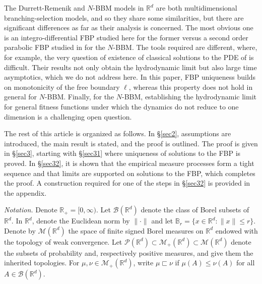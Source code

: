 \documentclass[11pt]{amsart}
\theoremstyle{plain}
\newcommand{\R}{{\mathbb R}}
\newcommand{\calB}{{\mathcal B}}
\newcommand{\calM}{{\mathcal M}}
\newcommand{\calP}{{\mathcal P}}
\newcommand{\iy}{\infty}
\begin{document}
The Durrett-Remenik and $N$-BBM models in $\R^d$ are both multidimensional branching-selection models, and so they share some similarities, but there are significant differences as far as their analysis is concerned. The most obvious one is an integro-differential FBP studied here for the former versus a second order parabolic FBP studied in \cite{ber21, ber22bee} for the $N$-BBM.
The tools required are different, where, for example, the very question of existence of classical solutions to the PDE of \cite{ber21, ber22bee} is difficult. Their results not only obtain the hydrodynamic limit but also large time asymptotics, which we do not address here.
In this paper, FBP uniqueness builds on monotonicity of the free boundary $\ell$, whereas this property does not hold in general for $N$-BBM. Finally, for the $N$-BBM, establishing the hydrodynamic limit for general fitness functions under which the dynamics do not reduce to one dimension is a challenging open question.

The rest of this article is organized as follows.
In \S \ref{sec2}, assumptions are introduced, the main result is stated, and the proof is outlined. The proof is given in \S\ref{sec3},
starting with \S\ref{sec31} where uniqueness of solutions to the FBP is proved.
In \S\ref{sec32}, it is shown that the empirical measure processes
form a tight sequence and that limits are supported on solutions
to the FBP, which completes the proof. A construction required for one of the steps in \S\ref{sec32} is provided in the appendix.




{\it Notation.}
Denote $\R_+=[0,\iy)$. Let $\calB(\R^d)$ denote the class of Borel subsets of $\R^d$.
In $\R^d$, denote the Euclidean norm by $\|\cdot\|$
and let $\mathbb{B}_r=\{x\in\R^d:\|x\|\le r\}$.
Denote by $\calM(\R^d)$ the space of finite signed Borel measures on $\R^d$
endowed with the topology of weak convergence.
Let $\calP(\R^d)\subset\calM_+(\R^d)\subset\calM(\R^d)$
denote the subsets of probability and, respectively positive measures,
and give them the inherited topologies.
For $\mu,\nu\in\calM_+(\R^d)$,
write $\mu\sqsubset\nu$ if $\mu(A)\le\nu(A)$ for all $A\in\calB(\R^d)$.
\end{document}
